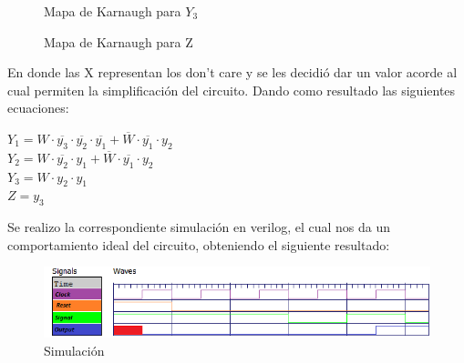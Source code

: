 \begin{center}
	\begin{figure}[h!]
		\begin{minipage}{0.5\textwidth}
			\caption{Mapa de Karnaugh para $Y_3$}
			\centering
			\begin{Karnaugh}
			\end{Karnaugh}
		\end{minipage}
		 \hspace{5mm}
		\begin{minipage}{0.5\textwidth}
			\caption{Mapa de Karnaugh para Z}
			\centering
			\begin{Karnaughvuit}
			\end{Karnaughvuit}
		\end{minipage}
	\end{figure}
\end{center}
En donde las X representan los don't care y se les decidió dar un valor acorde al cual permiten la simplificación del circuito. Dando como resultado las siguientes ecuaciones:\\
\begin{center}
	$Y_1 = W \cdot \overline{ y_3 } \cdot \overline{ y_2} \cdot \overline{ y_1 } + \overline{ W } \cdot \overline{ y_1} \cdot y_2  $\\
	$Y_2 = W \cdot \overline{ y_2} \cdot  y_1  + \overline{ W } \cdot \overline{ y_1} \cdot y_2  $\\
	$Y_3 = W \cdot  y_2 \cdot  y_1   $\\
	$Z = y_3  $\\
\end{center}
Se realizo la correspondiente simulación en verilog, el cual nos da un comportamiento ideal del circuito, obteniendo el siguiente resultado:\\
\FloatBarrier
\begin{figure}[h!]
	\centering
	\includegraphics[scale=0.8]{../Ejercicio-2/Simulacion_Moore.png}
	\caption{Simulación}
\end{figure}
\FloatBarrier
